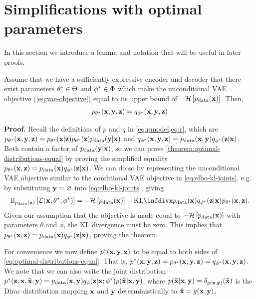 \section{Simplifications with optimal parameters}

In this section we introduce a lemma and notation that will be useful in later proofs.

\begin{theorem} \label{theorem:optimal-distributions-equal}
    Assume that we have a sufficiently expressive
  encoder and decoder that there exist parameters ${\theta}^*\in\Theta$
  and ${\phi}^*\in\Phi$ which make the unconditional VAE objective
  (\cref{eq:vae-objective}) equal to its upper bound of $-\mathcal{H}\left[ p_{\rm{data}}({\mathbf{x}})
  \right]$. Then,
\begin{equation} \label{eq:optimal-distributions-equal}
  p_{{\theta}^*}({\mathbf{x}},{\mathbf{y}},{\mathbf{z}}) = q_{{\phi}^*}({\mathbf{x}},{\mathbf{y}},{\mathbf{z}})
\end{equation}
\end{theorem}

\textbf{Proof.} Recall the definitions of $p$ and $q$ in \cref{eq:pmodel,eq:r}, which are $p_{{\theta}^*}({\mathbf{x}},{\mathbf{y}},{\mathbf{z}}) = p_{{\theta}^*}({\mathbf{x}}|{\mathbf{z}})p_{{\theta}^*}({\mathbf{z}})p_{\rm{data}}({\mathbf{y}}|{\mathbf{x}})$ and $q_{{\phi}^*}({\mathbf{x}},{\mathbf{y}},{\mathbf{z}}) = p_{\rm{data}}({\mathbf{x}},{\mathbf{y}})q_{{\phi}^*}({\mathbf{z}}|{\mathbf{x}})$. Both contain a factor of $p_{\rm{data}}({\mathbf{y}}|{\mathbf{x}})$, so we can prove \cref{theorem:optimal-distributions-equal} by proving the simplified equality $p_{{\theta}^*}({\mathbf{x}},{\mathbf{z}}) = p_{\rm{data}}({\mathbf{x}}) q_{{\phi}^*}({\mathbf{z}}|{\mathbf{x}})$. We can do so by representing the unconditional VAE objective similar to the conditional VAE objective in \cref{eq:elbo-kl-joints}, e.g. by substituting ${\mathbf{y}} = \varnothing$ into \cref{eq:elbo-kl-joints}, giving
\begin{equation}
    \EX_{\pdata(\rvx)} \left[ \gL(\rvx,\optimal{\theta},\optimal{\phi}) \right] =  - \gH \left[ \pdata(\rvx) \right] 
    - \kl{ \pdata(\rvx)q_{\optimal{\phi}}(\rvz|\rvx) 
    }{
    p_{\optimal{\theta}}(\rvx,\rvz) 
    }.
\end{equation}
Given our assumption that the objective is made equal to $- {\mathcal{H}} \left[ p_{\rm{data}}({\mathbf{x}}) \right]$ with parameters $\theta$ and $\phi$, the KL divergence must be zero. This implies that $p_{{\theta}^*}({\mathbf{x}},{\mathbf{z}}) = p_{\rm{data}}({\mathbf{x}})q_{{\phi}^*}({\mathbf{z}}|{\mathbf{x}}) $, proving the theorem.

For convenience we now define ${p}^*({\mathbf{x}},{\mathbf{y}},{\mathbf{z}})$ to be equal to both sides of \cref{eq:optimal-distributions-equal}. That is, ${p}^*({\mathbf{x}},{\mathbf{y}},{\mathbf{z}}) = p_{{\theta}^*}({\mathbf{x}},{\mathbf{y}},{\mathbf{z}}) = q_{{\phi}^*}({\mathbf{x}},{\mathbf{y}},{\mathbf{z}})$. We note that we can also write the joint
distribution ${p}^*({\mathbf{z}}, {\mathbf{x}}, \mathbf{\tilde{x}}{}, {\mathbf{y}}) = p_{\rm{data}} ({\mathbf{x}},
{\mathbf{y}}) q_\phi({\mathbf{z}}|{\mathbf{x}}; {\phi}^*)p(\mathbf{\tilde{x}}{}|{\mathbf{x}},{\mathbf{y}})$, where
$p(\mathbf{\tilde{x}}{}|{\mathbf{x}},{\mathbf{y}})=\delta_{g({\mathbf{x}},{\mathbf{y}})}(\mathbf{\tilde{x}}{})$ is the Dirac
distribution mapping ${\mathbf{x}}$ and ${\mathbf{y}}$ deterministically to
$\mathbf{\tilde{x}}{}=g({\mathbf{x}},{\mathbf{y}})$.

